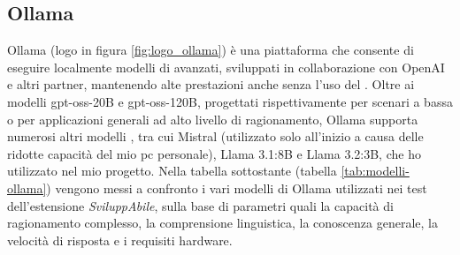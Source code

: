 \subsection{Ollama}
\label{subsec:ollama}
\noindent Ollama (logo in figura \ref{fig:logo_ollama}) è una piattaforma che consente di eseguire localmente modelli di  avanzati, sviluppati in collaborazione con OpenAI e altri partner, mantenendo alte prestazioni anche senza l’uso del . 
Oltre ai modelli gpt-oss-20B e gpt-oss-120B, progettati rispettivamente per scenari a bassa  o per applicazioni generali ad alto livello di ragionamento, Ollama supporta numerosi altri modelli , tra cui Mistral (utilizzato solo all’inizio a causa delle ridotte capacità del mio pc personale), Llama 3.1:8B e Llama 3.2:3B, che ho utilizzato nel mio progetto. Nella tabella sottostante (tabella \ref{tab:modelli-ollama}) vengono messi a confronto i vari modelli di Ollama utilizzati nei test dell'estensione \textit{SviluppAbile}, sulla base di parametri quali la capacità di ragionamento complesso, la comprensione linguistica, la conoscenza generale, la velocità di risposta e i requisiti hardware.\\ 

